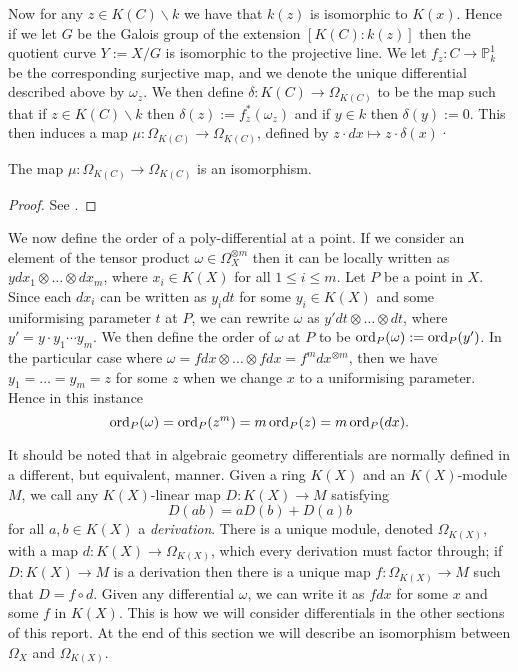 Now for any $z\in K(C) \backslash k$ we have that $k(z)$ is isomorphic to $K(x)$.
Hence if we let $G$ be the Galois group of the extension $[K(C):k(z)]$ then the quotient curve $Y:=X/G$ is isomorphic to the projective line.
We let $f_z\colon C \rightarrow \mathbb P_k^1$ be the corresponding surjective map, and we denote the unique differential described above by $\omega_z$.
We then define $\delta\colon K(C) \rightarrow \Omega_{K(C)}$ to be the map such that if $z\in K(C)\backslash k$ then $\delta (z) := f_z^*(\omega_z)$ and if $y\in k$ then $\delta(y):=0$.
This then induces a map $\mu\colon \Omega_{K(C)} \rightarrow \Omega_{K(C)}$, defined by $z\cdot dx \mapsto z\cdot \delta(x)$·

    \begin{thm}
    The map $\mu\colon \Omega_{K(C)} \rightarrow \Omega_{K(C)}$ is an isomorphism.
    \end{thm}
    \begin{proof}
    See \cite[Thm. 4.3.2]{stichtenoth}.
    \end{proof}

We now define the order of a poly-differential at a point.
If we consider an element of the tensor product $\omega \in \Omega_X^{\otimes m}$ then it can be locally written as $y dx_1\otimes \ldots \otimes dx_m$, where $x_i \in K(X)$ for all $1 \leq i \leq m$.
Let $P$ be a point in $X$.
Since each $dx_i$ can be written as $y_i dt$ for some $y_i\in K(X)$ and some uniformising parameter $t$ at $P$, we can rewrite $\omega$ as $y' dt \otimes \ldots \otimes dt$, where $y' = y \cdot y_1 \cdots y_m$.
We then define the order of $\omega$ at $P$ to be $\operatorname{ord}_P(\omega ) := \operatorname{ord}_P(y')$.
In the particular case where $\omega = fdx \otimes \ldots \otimes fdx = f^m dx^{\otimes m}$, then we have $y_1 = \ldots = y_m = z$ for some $z$ when we change $x$ to a uniformising parameter.
Hence in this instance 
    \[ 
    \operatorname{ord}_P(\omega) = \operatorname{ord}_P(z^m) = m\operatorname{ord}_P(z) = m\operatorname{ord}_P(dx).
    \]





It should be noted that in algebraic geometry differentials are normally defined in a different, but equivalent, manner.
Given a ring $K(X)$ and an $K(X)$-module $M$, we call any $K(X)$-linear map $D\colon K(X)\rightarrow M$ satisfying 
    \[
    D(ab) = aD(b) + D(a)b
    \]
for all $a,b\in K(X)$ a {\em derivation}.
There is a unique module, denoted $\Omega_{K(X)}$, with a map $d\colon K(X) \rightarrow \Omega_{K(X)}$, which every derivation must factor through; \ie if $D\colon K(X)\rightarrow M$ is a derivation then there is a unique map $f\colon \Omega_{K(X)}\rightarrow M$ such that $D = f\circ d$.
Given any differential $\omega$, we can write it as $fdx$ for some $x$ and some $f$ in $K(X)$.
This is how we will consider differentials in the other sections of this report.
At the end of this section we will describe an isomorphism between $\Omega_X$ and $\Omega_{K(X)}$.


